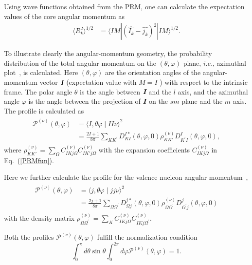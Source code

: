 \documentclass[aps,prc,preprint,showpacs,groupedaddress,floatfix,amsmath,amssymb]{revtex4-1}
\begin{document}
Using wave functions obtained from the PRM, one can calculate the
expectation values of the core angular momentum as
\begin{eqnarray}
\langle R_{k}^2 \rangle^{1/2} & = \langle I M |(\hat{I_{k}}-\hat{j_{k}})^{2}|I M \rangle^{1/2}.
\end{eqnarray}


To illustrate clearly the angular-momentum geometry,  the probability distribution of the total angular momentum on the $(\theta, \varphi)$
plane, $i.e.$, azimuthal plot~\cite{Streck18,CFQ17,CQB18,CQB19}, is calculated.
Here $(\theta, \varphi)$ are the orientation angles of the angular-momentum
vector $\textit{\textbf{I}}$ (expectation value with $M = I$ ) with
respect to the intrinsic frame. The polar angle $\theta$ is the
angle between $\textit{\textbf{I}}$ and the $l$ axis, and the
azimuthal angle $\varphi$ is the angle between the projection of $\textit{\textbf{I}}$ on
the $sm$ plane and the $m$ axis. The
profile is calculated as~\cite{Streck18,Qi21}
\begin{eqnarray}\label{APlot}
\begin{aligned}
\mathcal{P}^{(\nu)}(\theta, \varphi)&=\langle I, \theta \varphi \mid I I \nu\rangle^{2}\\
&=\frac{2I+1}{8\pi}\sum\limits_{K K^{\prime}} D_{K I}^{I *}(\theta, \varphi, 0)
\rho_{KK'}^{(\nu)} D_{K^{\prime} I}^{I}(\theta, \varphi, 0),
\end{aligned}
\end{eqnarray}
where $\rho_{KK'}^{(\nu)}=\sum\limits_{\Omega}C_{IKj\Omega}^{(\nu)}C_{IK'j\Omega}^{(\nu)}$ with the expansion coefficients $C_{IKj\Omega}^{(\nu)}$ in Eq.~(\ref{PRMfun}).

Here we further calculate the profile for the valence nucleon angular momentum~\cite{Frauendorf20},
\begin{eqnarray}
\begin{aligned}
\mathcal{P}^{(\nu)}(\theta, \varphi)&=\langle j, \theta \varphi \mid j j\nu\rangle^{2}\\
&=\frac{2j+1}{8\pi}\sum\limits_{\Omega \Omega^{\prime}} D_{\Omega j}^{j *}(\theta, \varphi, 0)
\rho_{\Omega \Omega^{\prime}}^{(\nu)} D_{\Omega^{\prime}j}^{j}(\theta, \varphi, 0)
\end{aligned}
\end{eqnarray}
with the density matrix
$\rho_{\Omega\Omega^{\prime}}^{(\nu)}=\sum\limits_{K} C_{I K j\Omega}^{(\nu)} C_{I K j\Omega^{\prime}}^{(\nu)}$.

Both the profiles $\mathcal{P}^{(\nu)}(\theta, \varphi)$ fulfill the normalization condition
$$\int_{0}^{\pi} d \theta \sin \theta \int_{0}^{2 \pi} d \varphi \mathcal{P}^{(\nu)}(\theta, \varphi)=1.$$
\end{document}
